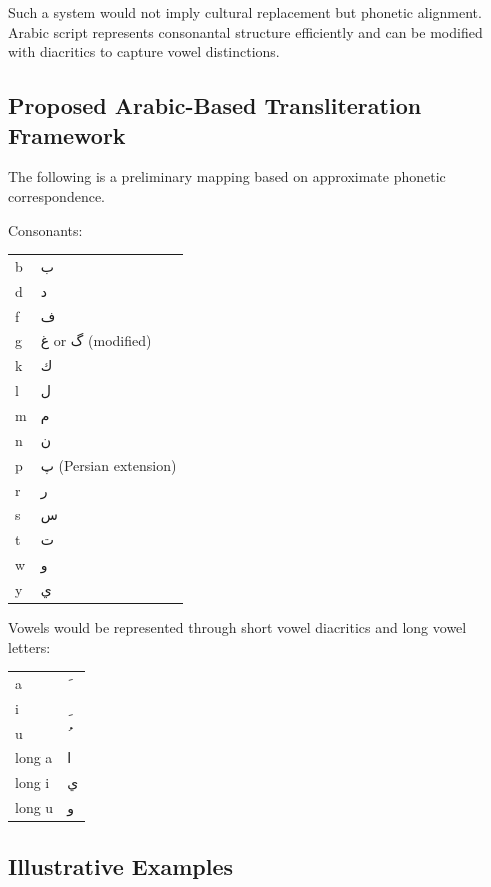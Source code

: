 \documentclass[12pt]{article}
\newcommand{\AR}[1]{\foreignlanguage{arabic}{#1}}
\begin{document}
Such a system would not imply cultural replacement but phonetic alignment. Arabic script represents consonantal structure efficiently and can be modified with diacritics to capture vowel distinctions.

\subsection{Proposed Arabic-Based Transliteration Framework}

The following is a preliminary mapping based on approximate phonetic correspondence.

Consonants:

\begin{center}
\begin{tabular}{ll}
b & \AR{ب} \\
d & \AR{د} \\
f & \AR{ف} \\
g & \AR{غ} or \AR{گ} (modified) \\
k & \AR{ك} \\
l & \AR{ل} \\
m & \AR{م} \\
n & \AR{ن} \\
p & \AR{پ} (Persian extension) \\
r & \AR{ر} \\
s & \AR{س} \\
t & \AR{ت} \\
w & \AR{و} \\
y & \AR{ي} \\
\end{tabular}
\end{center}

Vowels would be represented through short vowel diacritics and long vowel letters:

\begin{center}
\begin{tabular}{ll}
a & \AR{َ} \\
i & \AR{ِ} \\
u & \AR{ُ} \\
long a & \AR{ا} \\
long i & \AR{ي} \\
long u & \AR{و} \\
\end{tabular}
\end{center}

\subsection{Illustrative Examples}
\end{document}
